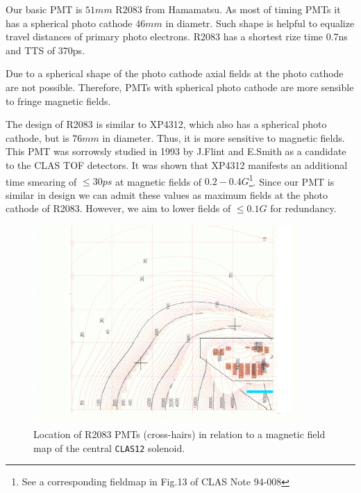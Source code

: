 \documentclass[12pt]{article}
\begin{document}
Our basic  PMT is $51mm$ R2083 from Hamamatsu.
As most of timing PMTs it has a spherical photo cathode $46mm$ in diametr.
Such shape is helpful to  equalize travel  distances of primary photo electrons. 
R2083 has a  shortest rize time 0.7ns  and  TTS of 370ps. 

Due to a spherical shape of the photo cathode    
 axial  fields at the photo cathode 
are not  possible. Therefore, PMTs with spherical photo cathode
are more  sensible to fringe  magnetic fields.

The design of R2083  is similar   to XP4312, which also has a spherical 
photo cathode, but is  $76mm$ in diameter. Thus, it is more sensitive to magnetic 
fields. This PMT  was sorrowsly studied in 1993 by J.Flint
and E.Smith as a candidate to the CLAS TOF detectors. It was shown that XP4312    
manifests  an  additional time smearing of $\leq30ps$  at magnetic fields 
of  $0.2-0.4G$\footnote{See a corresponding fieldmap in Fig.13 of  CLAS Note 94-008}.
Since our PMT is similar in design we can admit these values as  maximum fields 
at the photo cathode of R2083. However, we aim to lower fields of $\leq0.1G$
for redundancy.

\begin{figure}[htbp]
\centering
\includegraphics[width=0.9\textwidth]{mmap1.eps}
\caption{\small{Location of R2083 PMTs (cross-hairs) in relation to a
magnetic field map of the central {\tt CLAS12} solenoid.}}
\label{fig:mmap1}
\end{figure}
\end{document}
